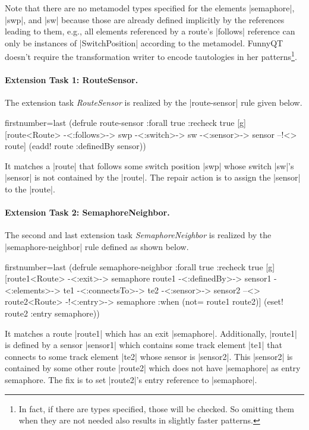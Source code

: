 \documentclass[submission]{eptcs}
\newcommand{\code}{\clojureinline}
\begin{document}
Note that there are no metamodel types specified for the elements
\code|semaphore|, \code|swp|, and \code|sw| because those are already defined
implicitly by the references leading to them, e.g., all elements referenced by
a route's \code|follows| reference can only be instances of
\code|SwitchPosition| according to the metamodel.  FunnyQT doesn't require the
transformation writer to encode tautologies in her patterns\footnote{In fact,
  if there are types specified, those will be checked.  So omitting them when
  they are not needed also results in slightly faster patterns.}.


\paragraph{Extension Task 1: RouteSensor.}

The extension task \emph{RouteSensor} is realized by the \code|route-sensor|
rule given below.

\begin{clojurecode*}{firstnumber=last}
(defrule route-sensor {:forall true :recheck true} [g]
  [route<Route> -<:follows>-> swp -<:switch>-> sw
   -<:sensor>-> sensor --!<> route]
  (eadd! route :definedBy sensor))
\end{clojurecode*}

It matches a \code|route| that follows some switch position \code|swp| whose
switch \code|sw|'s \code|sensor| is not contained by the \code|route|.  The
repair action is to assign the \code|sensor| to the \code|route|.


\paragraph{Extension Task 2: SemaphoreNeighbor.}

The second and last extension task \emph{SemaphoreNeighbor} is realized by the
\code|semaphore-neighbor| rule defined as shown below.

\begin{clojurecode*}{firstnumber=last}
(defrule semaphore-neighbor {:forall true :recheck true} [g]
  [route1<Route> -<:exit>-> semaphore
   route1 -<:definedBy>-> sensor1 -<:elements>-> te1
   -<:connectsTo>-> te2 -<:sensor>-> sensor2
   --<> route2<Route> -!<:entry>-> semaphore
   :when (not= route1 route2)]
  (eset! route2 :entry semaphore))
\end{clojurecode*}

It matches a route \code|route1| which has an exit \code|semaphore|.
Additionally, \code|route1| is defined by a sensor \code|sensor1| which
contains some track element \code|te1| that connects to some track element
\code|te2| whose sensor is \code|sensor2|.  This \code|sensor2| is contained by
some other route \code|route2| which does not have \code|semaphore| as entry
semaphore.  The fix is to set \code|route2|'s entry reference to
\code|semaphore|.
\end{document}
